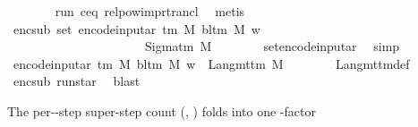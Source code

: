 \begin{isabellebody}
\ \ \ \ \ \ \isamarkupfalse%
\ run{\isacharprime}{\kern0pt}\ c{\isacharprime}{\kern0pt}{\isacharprime}{\kern0pt}{\isacharunderscore}{\kern0pt}eq\ relpow{\isacharunderscore}{\kern0pt}imp{\isacharunderscore}{\kern0pt}rtrancl\ \isamarkupfalse%
\ metis\isanewline
\ \ \ \ \isamarkupfalse%
\ enc{\isacharunderscore}{\kern0pt}sub{\isacharcolon}{\kern0pt}\ {\isachardoublequoteopen}set\ {\isacharparenleft}{\kern0pt}encode{\isacharunderscore}{\kern0pt}input{\isacharunderscore}{\kern0pt}ar\ {\isacharparenleft}{\kern0pt}{\isasymGamma}{\isacharunderscore}{\kern0pt}tm\ M{\isacharparenright}{\kern0pt}\ {\isacharparenleft}{\kern0pt}bl{\isacharunderscore}{\kern0pt}tm\ M{\isacharparenright}{\kern0pt}\ w{\isacharparenright}{\kern0pt}\isanewline
\ \ \ \ \ \ \ \ \ \ \ \ \ \ \ \ \ \ \ \ \ {\isasymsubseteq}\ Sigma{\isacharunderscore}{\kern0pt}tm\ {\isacharquery}{\kern0pt}M{\isacharprime}{\kern0pt}{\isachardoublequoteclose}\isanewline
\ \ \ \ \ \ \isamarkupfalse%
\ set{\isacharunderscore}{\kern0pt}encode{\isacharunderscore}{\kern0pt}input{\isacharunderscore}{\kern0pt}ar\ \isamarkupfalse%
\ simp\isanewline
\ \ \ \ \isamarkupfalse%
\ {\isachardoublequoteopen}encode{\isacharunderscore}{\kern0pt}input{\isacharunderscore}{\kern0pt}ar\ {\isacharparenleft}{\kern0pt}{\isasymGamma}{\isacharunderscore}{\kern0pt}tm\ M{\isacharparenright}{\kern0pt}\ {\isacharparenleft}{\kern0pt}bl{\isacharunderscore}{\kern0pt}tm\ M{\isacharparenright}{\kern0pt}\ w\ {\isasymin}\ Lang{\isacharunderscore}{\kern0pt}mttm\ {\isacharquery}{\kern0pt}M{\isacharprime}{\kern0pt}{\isachardoublequoteclose}\isanewline
\ \ \ \ \ \ \isamarkupfalse%
\ Lang{\isacharunderscore}{\kern0pt}mttm{\isacharunderscore}{\kern0pt}def\ \isamarkupfalse%
\ enc{\isacharunderscore}{\kern0pt}sub\ run{\isacharunderscore}{\kern0pt}star{\isacharprime}{\kern0pt}\ \isamarkupfalse%
\ blast\isanewline
\ \ \isamarkupfalse%
\isanewline
{}\isamarkupfalse%
%
\endisatagproof
{\isafoldproof}%
%
\isadelimproof
%
\endisadelimproof
%
\begin{isamarkuptext}%
The per--step super-step count 
  (, ) folds into one -factor

\end{isamarkuptext}
\end{isabellebody}
